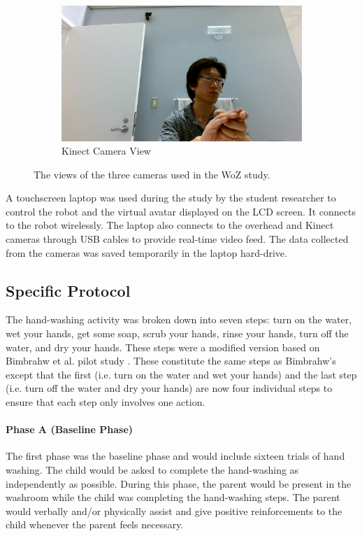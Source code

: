 \documentclass{ut-thesis}
\begin{document}
\begin{figure}[H]
	
	\begin{subfigure}[b]{0.49\textwidth}
		\includegraphics[width=1.1\linewidth]{./img/kinect_view}
		\caption{Kinect Camera View}
	\end{subfigure}%

	\caption{The views of the three cameras used in the WoZ study.}
	\label{fig:CameraViews}
\end{figure}


A touchscreen laptop was used during the study by the student researcher to control the robot and the virtual avatar displayed on the LCD screen. It connects to the robot wirelessly. The laptop also connects to the overhead and Kinect cameras through USB cables to provide real-time video feed. The data collected from the cameras was saved temporarily in the laptop hard-drive. 

\subsection{Specific Protocol}
\label{sec:SpecificProtocol}
The hand-washing activity was broken down into seven steps: turn on the water, wet your hands, get some soap, scrub your hands, rinse your hands, turn off the water, and dry your hands.  These steps were a modified version based on Bimbrahw et al. pilot study \cite{bimbrahw2012investigating}. These constitute the same steps as Bimbrahw's except that the first (i.e. turn on the water and wet your hands) and the last step (i.e. turn off the water and dry your hands) are now four individual steps to ensure that each step only involves one action.

\paragraph{Phase A (Baseline Phase)}
The first phase was the baseline phase and would include sixteen trials of hand washing. The child would be asked to complete the hand-washing as independently as possible. During this phase, the parent would be present in the washroom while the child was completing the hand-washing steps. The parent would verbally and/or physically assist and give positive reinforcements to the child whenever the parent feels necessary.
\end{document}
